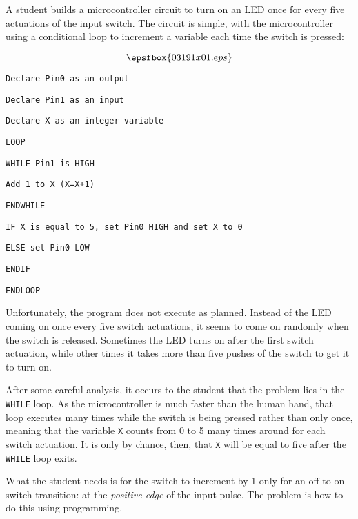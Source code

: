 

A student builds a microcontroller circuit to turn on an LED once for every five actuations of the input switch.  The circuit is simple, with the microcontroller using a conditional loop to increment a variable each time the switch is pressed:

$$\epsfbox{03191x01.eps}$$

\noindent
{}

{\tt Declare Pin0 as an output}

{\tt Declare Pin1 as an input}

{\tt Declare X as an integer variable}

{\tt LOOP}

\hskip 10pt {\tt WHILE Pin1 is HIGH}

\hskip 20pt {\tt Add 1 to X (X=X+1)}

\hskip 10pt {\tt ENDWHILE}

\hskip 10pt {\tt IF X is equal to 5, set Pin0 HIGH and set X to 0}

\hskip 10pt {\tt ELSE set Pin0 LOW}

\hskip 10pt {\tt ENDIF}

{\tt ENDLOOP}

\vskip 10pt

Unfortunately, the program does not execute as planned.  Instead of the LED coming on once every five switch actuations, it seems to come on randomly when the switch is released.  Sometimes the LED turns on after the first switch actuation, while other times it takes more than five pushes of the switch to get it to turn on.

After some careful analysis, it occurs to the student that the problem lies in the {\tt WHILE} loop.  As the microcontroller is much faster than the human hand, that loop executes many times while the switch is being pressed rather than only once, meaning that the variable {\tt X} counts from 0 to 5 many times around for each switch actuation.  It is only by chance, then, that {\tt X} will be equal to five after the {\tt WHILE} loop exits.

What the student needs is for the switch to increment by 1 only for an off-to-on switch transition: at the {\it positive edge} of the input pulse.  The problem is how to do this using programming.

